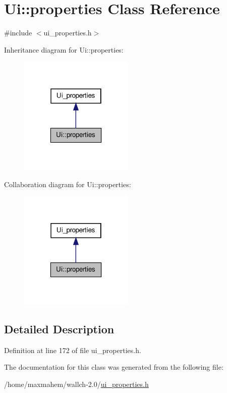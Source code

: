 \hypertarget{classUi_1_1properties}{
\section{Ui::properties Class Reference}
\label{classUi_1_1properties}
}


{\ttfamily \#include $<$ui\_\-properties.h$>$}



Inheritance diagram for Ui::properties:
\nopagebreak
\begin{figure}[H]
\begin{center}
\leavevmode
\includegraphics[width=154pt]{classUi_1_1properties__inherit__graph}
\end{center}
\end{figure}


Collaboration diagram for Ui::properties:
\nopagebreak
\begin{figure}[H]
\begin{center}
\leavevmode
\includegraphics[width=154pt]{classUi_1_1properties__coll__graph}
\end{center}
\end{figure}


\subsection{Detailed Description}


Definition at line 172 of file ui\_\-properties.h.



The documentation for this class was generated from the following file:\begin{DoxyCompactItemize}
\item 
/home/maxmahem/wallch-\/2.0/\hyperlink{ui__properties_8h}{ui\_\-properties.h}\end{DoxyCompactItemize}
